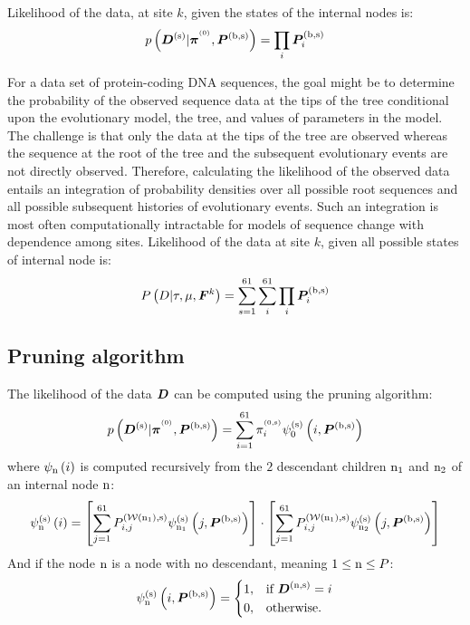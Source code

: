 Likelihood of the data, at site $k$, given the states of the internal nodes is:
\begin{equation*}
p\left(\bm{D}^{(\text{s})}|\bm{\pi}^{^{(0)}}, \bm{P}^{(\text{b}, \text{s})} \right) = \prod_{i} \bm{P}^{(\text{b}, \text{s})}_{i}
\end{equation*}

For a data set of protein-coding \acrshort{DNA} sequences, the goal might be to determine the probability of the observed sequence data at the tips of the tree conditional upon the evolutionary model, the tree, and values of parameters in the model. The challenge is that only the data at the tips of the tree are observed whereas the sequence at the root of the tree and the subsequent evolutionary events are not directly observed. Therefore, calculating the \gls{likelihood} of the observed data entails an integration of probability densities over all possible root sequences and all possible subsequent histories of evolutionary events. Such an integration is most often computationally intractable for models of sequence change with dependence among sites.
Likelihood of the data at site $k$, given all possible states of internal node is:
\begin{equation*}
P\left(D| \tau, \mu, \bm{F}^{k}\right) = \sum_{s=1}^{61} \sum_{i}^{61} \prod_{i} \bm{P}^{(\text{b}, \text{s})}_{i}
\end{equation*}

\subsection{Pruning algorithm}


The likelihood of the data $\bm{D}$ can be computed using the pruning algorithm:
\begin{equation}
p\left(\bm{D}^{(\text{s})}|\bm{\pi}^{^{(0)}}, \bm{P}^{(\text{b}, \text{s})} \right) = \sum_{{i}=1}^{61} \pi_{{i}}^{^{(0, \text{s})}} \psi^{(\text{s})}_{0} \left( {i}, \bm{P}^{(\text{b}, \text{s})} \right)
\end{equation}
where $\psi_{\text{n}} \left( {i} \right)$ is computed recursively from the $2$  descendant children $\text{n}_{1}$ and $\text{n}_{2}$ of an internal node $\text{n}$:
\begin{equation}
\psi^{(\text{s})}_{\text{n}} \left( {i} \right) = \left[ \sum_{{j}=1}^{61} P^{(\mathcal{W}\left(\text{n}_{1}\right), \text{s})}_{{i}, {j}} \psi^{(\text{s})}_{\text{n}_{1}} \left( {j}, \bm{P}^{(\text{b}, \text{s})} \right) \right] \cdot \left[ \sum_{{j}=1}^{61} P^{(\mathcal{W}\left(\text{n}_{1}\right), \text{s})}_{{i}, {j}} \psi^{(\text{s})}_{\text{n}_{2}} \left( {j}, \bm{P}^{(\text{b}, \text{s})} \right) \right]
\end{equation}
And if the node $\text{n}$ is a node with no descendant, meaning $1 \leq \text{n} \leq P$:
\begin{equation}
\psi^{(\text{s})}_{\text{n}}\left( {i}, \bm{P}^{(\text{b}, \text{s})} \right) =
\begin{dcases}
1, & \text{if }\bm{D}^{(\text{n}, \text{s})} =  {i} \\
0, & \text{otherwise.}
\end{dcases}
\end{equation}

